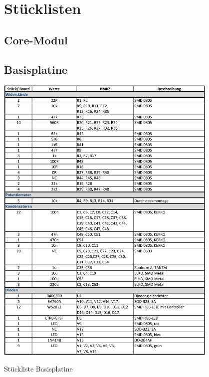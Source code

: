 \section{Stücklisten}
\label{sec:stücklisten}

\subsection{Core-Modul}
\label{sec:stücklisten-core}

\subsection{Basisplatine}
\label{sec:stücklisten-basis}
\begin{table}[H]
    \centering
    \includegraphics[width=0.8\textwidth]{Schuh/Pictures/stuck-basis1}
    \caption[Stückliste Basisplatine]{Stückliste \gls{Basisplatine}}
    \label{tab:stücklisten-basis}
\end{table}
